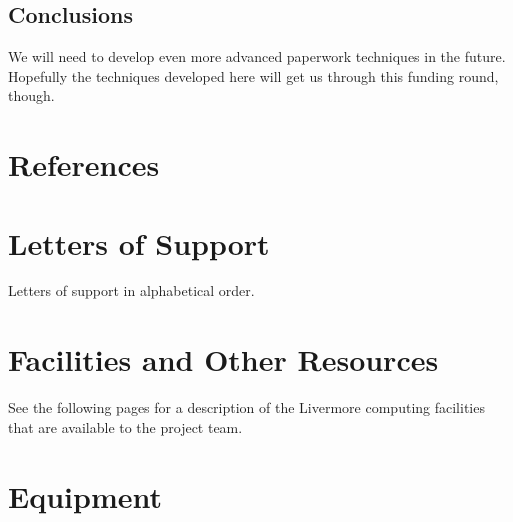 \documentclass[11pt]{article}
\begin{document}
\subsection{Conclusions}
We will need to develop even more advanced paperwork techniques in the future. Hopefully
the techniques developed here will get us through this funding round, though.

\newpage
\appendix %

\begingroup
\section{References}
\printbibliography[heading=none]
\endgroup

\newpage
\section{Letters of Support}

Letters of support in alphabetical order.


%
%

\section{Facilities and Other Resources} \label{sec:facilities}
See the following pages for a description of the Livermore computing facilities
that are available to the project team.



\section{Equipment}
\end{document}
